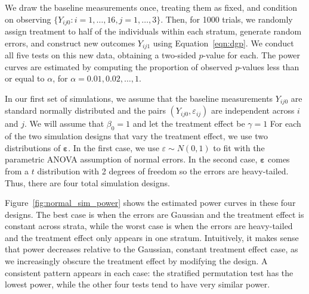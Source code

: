 \documentclass[11pt]{article}
\begin{document}
\noindent We draw the baseline measurements once, treating them as fixed, and condition on observing $\{ Y_{ij0} : {i = 1,\dots,16, j = 1,\dots, 3}\}$.
Then, for 1000 trials, we randomly assign treatment to half of the individuals within each stratum, generate random errors, and construct new outcomes $Y_{ij1}$ using Equation~\ref{eqn:dgp}.
We conduct all five tests on this new data, obtaining a two-sided $p$-value for each.
The power curves are estimated by computing the proportion of observed $p$-values less than or equal to $\alpha$, for $\alpha = 0.01, 0.02, \dots, 1$.

In our first set of simulations, we assume that the baseline measurements $Y_{ij0}$ are standard normally distributed and the pairs $(Y_{ij0}, \varepsilon_{ij})$ are independent across $i$ and $j$.
We will assume that $\beta_0 = 1$ and let the treatment effect be $\gamma = 1$
For each of the two simulation designs that vary the treatment effect, we use two distributions of $\mathbf{\varepsilon}$.
In the first case, we use $\varepsilon \sim N(0, 1)$ to fit with the parametric ANOVA assumption of normal errors.
In the second case, $\mathbf{\varepsilon}$ comes from a $t$ distribution with 2 degrees of freedom so the errors are heavy-tailed.
Thus, there are four total simulation designs.

Figure~\ref{fig:normal_sim_power} shows the estimated power curves in these four designs.
The best case is when the errors are Gaussian and the treatment effect is constant across strata, while the worst case is when the errors are heavy-tailed and the treatment effect only appears in one stratum.
Intuitively, it makes sense that power decreases relative to the Gaussian, constant treatment effect case, as we increasingly obscure the treatment effect by modifying the design.
A consistent pattern appears in each case: the stratified permutation test has the lowest power, while the other four tests tend to have very similar power.
\end{document}
